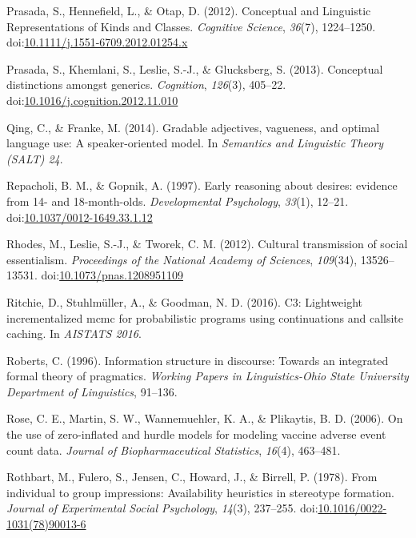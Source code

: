 \documentclass[english,,man,floatsintext]{apa6}
\theoremstyle{definition}
\theoremstyle{definition}
\theoremstyle{definition}
\theoremstyle{remark}
\begin{document}
\leavevmode\hypertarget{ref-Prasada2012}{}%
Prasada, S., Hennefield, L., \& Otap, D. (2012). Conceptual and
Linguistic Representations of Kinds and Classes. \emph{Cognitive
Science}, \emph{36}(7), 1224--1250.
doi:\href{https://doi.org/10.1111/j.1551-6709.2012.01254.x}{10.1111/j.1551-6709.2012.01254.x}

\leavevmode\hypertarget{ref-Prasada2013}{}%
Prasada, S., Khemlani, S., Leslie, S.-J., \& Glucksberg, S. (2013).
Conceptual distinctions amongst generics. \emph{Cognition},
\emph{126}(3), 405--22.
doi:\href{https://doi.org/10.1016/j.cognition.2012.11.010}{10.1016/j.cognition.2012.11.010}

\leavevmode\hypertarget{ref-Qing2014}{}%
Qing, C., \& Franke, M. (2014). Gradable adjectives, vagueness, and
optimal language use: A speaker-oriented model. In \emph{Semantics and
Linguistic Theory (SALT) 24}.

\leavevmode\hypertarget{ref-Repacholi1997}{}%
Repacholi, B. M., \& Gopnik, A. (1997). Early reasoning about desires:
evidence from 14- and 18-month-olds. \emph{Developmental Psychology},
\emph{33}(1), 12--21.
doi:\href{https://doi.org/10.1037/0012-1649.33.1.12}{10.1037/0012-1649.33.1.12}

\leavevmode\hypertarget{ref-Rhodes2012}{}%
Rhodes, M., Leslie, S.-J., \& Tworek, C. M. (2012). Cultural
transmission of social essentialism. \emph{Proceedings of the National
Academy of Sciences}, \emph{109}(34), 13526--13531.
doi:\href{https://doi.org/10.1073/pnas.1208951109}{10.1073/pnas.1208951109}

\leavevmode\hypertarget{ref-Ritchie2016}{}%
Ritchie, D., Stuhlmüller, A., \& Goodman, N. D. (2016). C3: Lightweight
incrementalized mcmc for probabilistic programs using continuations and
callsite caching. In \emph{AISTATS 2016}.

\leavevmode\hypertarget{ref-roberts1996qud}{}%
Roberts, C. (1996). Information structure in discourse: Towards an
integrated formal theory of pragmatics. \emph{Working Papers in
Linguistics-Ohio State University Department of Linguistics}, 91--136.

\leavevmode\hypertarget{ref-hurdleModels}{}%
Rose, C. E., Martin, S. W., Wannemuehler, K. A., \& Plikaytis, B. D.
(2006). On the use of zero-inflated and hurdle models for modeling
vaccine adverse event count data. \emph{Journal of Biopharmaceutical
Statistics}, \emph{16}(4), 463--481.

\leavevmode\hypertarget{ref-Rothbart1978}{}%
Rothbart, M., Fulero, S., Jensen, C., Howard, J., \& Birrell, P. (1978).
From individual to group impressions: Availability heuristics in
stereotype formation. \emph{Journal of Experimental Social Psychology},
\emph{14}(3), 237--255.
doi:\href{https://doi.org/10.1016/0022-1031(78)90013-6}{10.1016/0022-1031(78)90013-6}
\end{document}
